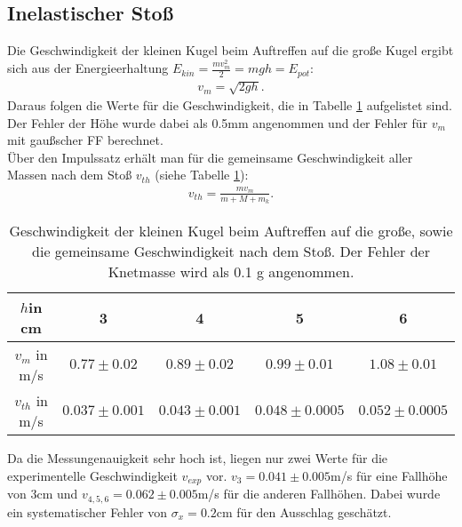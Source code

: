 \subsection*{Inelastischer Stoß}
Die Geschwindigkeit der kleinen Kugel beim Auftreffen auf die große Kugel ergibt sich aus der Energieerhaltung $E_{kin}=\frac{mv_{m}^{2}}{2}=mgh=E_{pot}$:\\
\begin{align*}
v_{m}=\sqrt{2gh}.
\end{align*}
Daraus folgen die Werte für die Geschwindigkeit, die in Tabelle \ref{vm} aufgelistet sind. Der Fehler der Höhe wurde dabei als 0.5\;mm angenommen und der Fehler für $v_{m}$ mit gaußscher FF berechnet.\\
Über den Impulssatz erhält man für die gemeinsame Geschwindigkeit aller Massen nach dem Stoß $v_{th}$ (siehe Tabelle \ref{vm}):
\begin{align*}
v_{th}=\frac{mv_{m}}{m+M+m_{k}}.
\end{align*}
\begin{table}
\begin{center}
\begin{tabular}{|c|c|c|c|c|}
$h$in cm&3&4&5&6\\
\hline
$v_{m}$ in m/s&$0.77\pm 0.02$&$0.89\pm 0.02$&$0.99\pm 0.01$&$1.08\pm 0.01$\\
\hline
$v_{th}$ in m/s& $0.037\pm 0.001$&$0.043\pm 0.001 $ &$0.048\pm 0.0005$ &$0.052\pm 0.0005 $ \\
\hline
\end{tabular}
\end{center}
\caption{Geschwindigkeit der kleinen Kugel beim Auftreffen auf die große, sowie die gemeinsame Geschwindigkeit nach dem Stoß. Der Fehler der Knetmasse wird als 0.1 g angenommen.\label{vm}}
\end{table}
Da die Messungenauigkeit sehr hoch ist, liegen nur zwei Werte für die experimentelle Geschwindigkeit $v_{exp}$ vor. $v_{3}=0.041 \pm 0.005$\;m/s für eine Fallhöhe von 3\;cm und $v_{4,5,6}=0.062\pm 0.005 $\;m/s für die anderen Fallhöhen. Dabei wurde ein systematischer Fehler von $\sigma_{x}=0.2$\;cm für den Ausschlag geschätzt.
